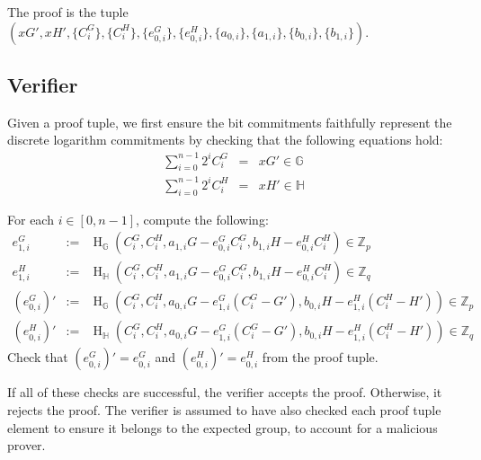 \documentclass{mrl}
\newcommand{\hg}{\operatorname{H}_\mathbb{G}}
\newcommand{\hh}{\operatorname{H}_\mathbb{H}}
\newcommand{\zp}{\mathbb{Z}_p}
\newcommand{\zq}{\mathbb{Z}_q}
\begin{document}
The proof is the tuple $\left( xG',xH',\{C_i^G\},\{C_i^H\}, \{e_{0,i}^G\}, \{e_{0,i}^H\}, \{a_{0,i}\}, \{a_{1,i}\}, \{b_{0,i}\}, \{b_{1,i}\} \right)$.

\subsection{Verifier}
Given a proof tuple, we first ensure the bit commitments faithfully represent the discrete logarithm commitments by checking that the following equations hold:
\begin{eqnarray*}
\sum_{i=0}^{n-1} 2^iC_i^G &=& xG' \in \mathbb{G} \\
\sum_{i=0}^{n-1} 2^iC_i^H &=& xH' \in \mathbb{H}
\end{eqnarray*}

For each $i \in [0,n-1]$, compute the following:
\begin{eqnarray*}
e_{1,i}^G &:=& \hg\left( C_i^G, C_i^H, a_{1,i}G - e_{0,i}^GC_i^G, b_{1,i}H - e_{0,i}^HC_i^H \right) \in \zp \\
e_{1,i}^H &:=& \hh\left( C_i^G, C_i^H, a_{1,i}G - e_{0,i}^GC_i^G, b_{1,i}H - e_{0,i}^HC_i^H \right) \in \zq \\
(e_{0,i}^G)' &:=& \hg\left( C_i^G, C_i^H, a_{0,i}G - e_{1,i}^G(C_i^G-G'), b_{0,i}H - e_{1,i}^H(C_i^H-H') \right) \in \zp \\
(e_{0,i}^H)' &:=& \hh\left( C_i^G, C_i^H, a_{0,i}G - e_{1,i}^G(C_i^G-G'), b_{0,i}H - e_{1,i}^H(C_i^H-H') \right) \in \zq
\end{eqnarray*}
Check that $(e_{0,i}^G)' = e_{0,i}^G$ and $(e_{0,i}^H)' = e_{0,i}^H$ from the proof tuple.

If all of these checks are successful, the verifier accepts the proof. Otherwise, it rejects the proof. The verifier is assumed to have also checked each proof tuple element to ensure it belongs to the expected group, to account for a malicious prover.
\end{document}
